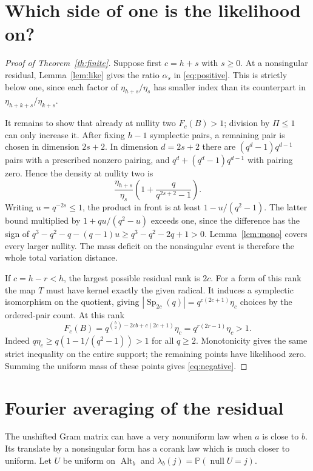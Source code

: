 \documentclass[11pt]{article}
\newcommand{\Alt}{\operatorname{Alt}}
\newcommand{\Sp}{\operatorname{Sp}}
\newcommand{\nil}{\operatorname{null}}
\newcommand{\Prob}{\mathbb P}
\begin{document}
\section{Which side of one is the likelihood on?}

\begin{proof}[Proof of Theorem~\ref{th:finite}]
Suppose first $c=h+s$ with $s\ge0$. At a nonsingular residual, Lemma~\ref{lem:like} gives the ratio $\alpha_s$ in \eqref{eq:positive}. This is strictly below one, since each factor of $\eta_{h+s}/\eta_s$ has smaller index than its counterpart in $\eta_{h+k+s}/\eta_{k+s}$.

It remains to show that already at nullity two $F_c(B)>1$; division by $\Pi\le1$ can only increase it. After fixing $h-1$ symplectic pairs, a remaining pair is chosen in dimension $2s+2$. In dimension $d=2s+2$ there are $(q^d-1)q^{d-1}$ pairs with a prescribed nonzero pairing, and $q^d+(q^d-1)q^{d-1}$ with pairing zero. Hence the density at nullity two is
\[
 \frac{\eta_{h+s}}{\eta_s}\left(1+\frac{q}{q^{2s+2}-1}\right).
\]
Writing $u=q^{-2s}\le1$, the product in front is at least $1-u/(q^2-1)$. The latter bound multiplied by $1+qu/(q^2-u)$ exceeds one, since the difference has the sign of
$q^3-q^2-q-(q-1)u\ge q^3-q^2-2q+1>0$. Lemma~\ref{lem:mono} covers every larger nullity. The mass deficit on the nonsingular event is therefore the whole total variation distance.

If $c=h-r<h$, the largest possible residual rank is $2c$. For a form of this rank the map $T$ must have kernel exactly the given radical. It induces a symplectic isomorphism on the quotient, giving $|\Sp_{2c}(q)|=q^{c(2c+1)}\eta_c$ choices by the ordered-pair count. At this rank
\[
 F_c(B)=q^{\binom b2-2cb+c(2c+1)}\eta_c
       =q^{r(2r-1)}\eta_c>1.
\]
Indeed $q\eta_c\ge q(1-1/(q^2-1))>1$ for all $q\ge2$. Monotonicity gives the same strict inequality on the entire support; the remaining points have likelihood zero. Summing the uniform mass of these points gives \eqref{eq:negative}.
\end{proof}

\section{Fourier averaging of the residual}

The unshifted Gram matrix can have a very nonuniform law when $a$ is close to $b$. Its translate by a nonsingular form has a corank law which is much closer to uniform. Let $U$ be uniform on $\Alt_b$ and $\lambda_b(j)=\Prob(\nil U=j)$.
\end{document}
